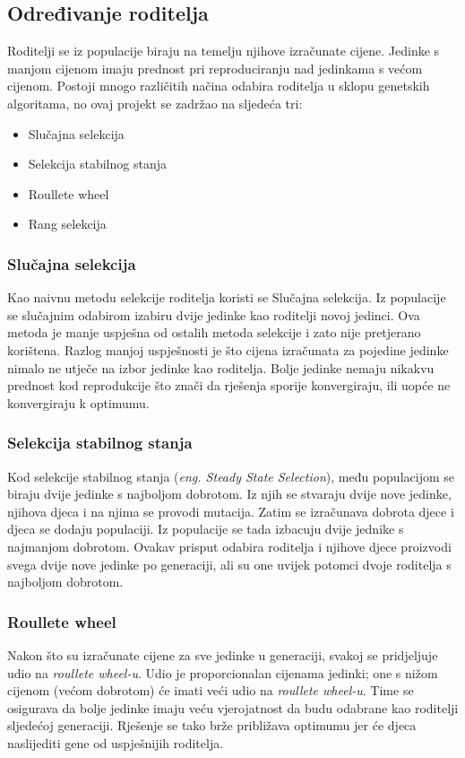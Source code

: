 \documentclass[times, utf8, zavrsni]{fer}
\begin{document}
\subsection{Određivanje roditelja}
Roditelji se iz populacije biraju na temelju njihove izračunate cijene. Jedinke s manjom cijenom imaju prednost pri reproduciranju nad jedinkama s većom cijenom. Postoji mnogo različitih načina odabira roditelja u sklopu genetskih algoritama, no ovaj projekt se zadržao na sljedeća tri:
\begin{itemize}
    \item Slučajna selekcija
    \item Selekcija stabilnog stanja
    \item Roullete wheel
    \item Rang selekcija
\end{itemize}

\subsubsection{Slučajna selekcija}
Kao naivnu metodu selekcije roditelja koristi se Slučajna selekcija. Iz populacije se slučajnim odabirom izabiru dvije jedinke kao roditelji novoj jedinci. Ova metoda je manje uspješna od ostalih metoda selekcije i zato nije pretjerano korištena. Razlog manjoj uspješnosti je što cijena izračunata za pojedine jedinke nimalo ne utječe na izbor jedinke kao roditelja. Bolje jedinke nemaju nikakvu prednost kod reprodukcije što znači da rješenja sporije konvergiraju, ili uopće ne konvergiraju k optimumu.

\subsubsection{Selekcija stabilnog stanja}
Kod selekcije stabilnog stanja (\textit{eng. Steady State Selection}), među populacijom se biraju dvije jedinke s najboljom dobrotom. Iz njih se stvaraju dvije nove jedinke, njihova djeca i na njima se provodi mutacija. Zatim se izračunava dobrota djece i djeca se dodaju populaciji. Iz populacije se tada izbacuju dvije jednike s najmanjom dobrotom. Ovakav prisput odabira roditelja i njihove djece proizvodi svega dvije nove jedinke po generaciji, ali su one uvijek potomci dvoje roditelja s najboljom dobrotom.  

\subsubsection{Roullete wheel}
Nakon što su izračunate cijene za sve jedinke u generaciji, svakoj se pridjeljuje udio na \textit{roullete wheel-u}. Udio je proporcionalan cijenama jedinki; one s nižom cijenom (većom dobrotom) će imati veći udio na \textit{roullete wheel-u}. Time se osigurava da bolje jedinke imaju veću vjerojatnost da budu odabrane kao roditelji sljedećoj generaciji. Rješenje se tako brže približava optimumu jer će djeca naslijediti gene od uspješnijih roditelja. 
\end{document}
